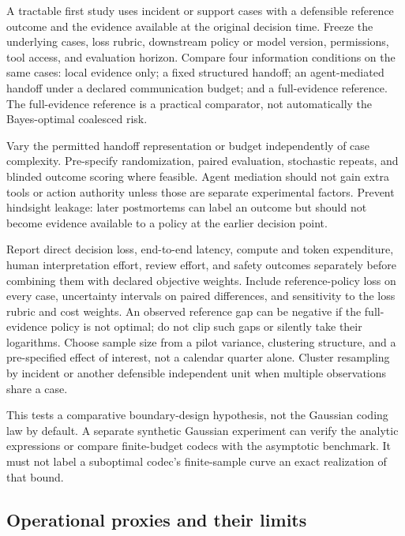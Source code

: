 \documentclass[11pt]{article}
\begin{document}
A tractable first study uses incident or support cases with a defensible
reference outcome and the evidence available at the original decision time.
Freeze the underlying cases, loss rubric, downstream policy or model version,
permissions, tool access, and evaluation horizon. Compare four information
conditions on the same cases: local evidence only; a fixed structured handoff;
an agent-mediated handoff under a declared communication budget; and a
full-evidence reference. The full-evidence reference is a practical comparator,
not automatically the Bayes-optimal coalesced risk.

Vary the permitted handoff representation or budget independently of case
complexity. Pre-specify randomization, paired evaluation, stochastic repeats,
and blinded outcome scoring where feasible. Agent mediation should not gain
extra tools or action authority unless those are separate experimental factors.
Prevent hindsight leakage: later postmortems can label an outcome but should
not become evidence available to a policy at the earlier decision point.

Report direct decision loss, end-to-end latency, compute and token expenditure,
human interpretation effort, review effort, and safety outcomes separately
before combining them with declared objective weights. Include reference-policy
loss on every case, uncertainty intervals on paired differences, and
sensitivity to the loss rubric and cost weights. An observed reference gap can
be negative if the full-evidence policy is not optimal; do not clip such gaps or
silently take their logarithms. Choose sample size from a pilot variance,
clustering structure, and a pre-specified effect of interest, not a calendar
quarter alone. Cluster resampling by incident or another defensible independent
unit when multiple observations share a case.

This tests a comparative boundary-design hypothesis, not the Gaussian coding
law by default. A separate synthetic Gaussian experiment can verify the
analytic expressions or compare finite-budget codecs with the asymptotic
benchmark. It must not label a suboptimal codec's finite-sample curve an exact
realization of that bound.

\subsection{Operational proxies and their limits}
\end{document}
